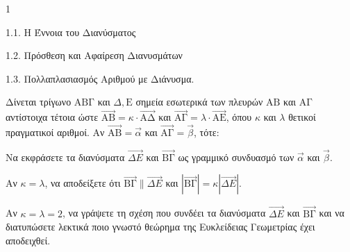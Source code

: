 \begin{ylh}{1}
    \item 1.1. Η Έννοια του Διανύσματος
    \item 1.2. Πρόσθεση και Αφαίρεση Διανυσμάτων
    \item 1.3. Πολλαπλασιασμός Αριθμού με Διάνυσμα.
\end{ylh}
Δίνεται τρίγωνο $\mathrm{AB\Gamma}$ και $\Delta, \mathrm{E}$ σημεία εσωτερικά των πλευρών $\mathrm{AB}$ και $\mathrm{A\Gamma}$ αντίστοιχα τέτοια ώστε $\vec{\mathrm{AB}}=\kappa \cdot \vec{\mathrm{A\Delta}}$ και $\vec{\mathrm{A\Gamma}}=\lambda \cdot \vec{\mathrm{AE}}$, όπου $\kappa$ και $\lambda$ θετικοί πραγματικοί αριθμοί. Αν $\vec{\mathrm{AB}}=\vec{\alpha}$ και $\vec{\mathrm{A\Gamma}}=\vec{\beta}$, τότε:
\begin{alist}
\item Να εκφράσετε τα διανύσματα $\vec{\Delta E}$ και $\vec{\mathrm{B\Gamma}}$ ως γραμμικό συνδυασμό των $\vec{\alpha}$ και $\vec{\beta}$. 
\item
    \begin{rlist}
    \item Αν $\kappa=\lambda$, να αποδείξετε ότι $\vec{\mathrm{B\Gamma}} \parallel \vec{\Delta E}$ και $|\vec{\mathrm{B\Gamma}}| = \kappa |\vec{\Delta E}|$. 
    \item Αν $\kappa=\lambda=2$, να γράψετε τη σχέση που συνδέει τα διανύσματα $\vec{\Delta E}$ και $\vec{\mathrm{B\Gamma}}$ και να διατυπώσετε λεκτικά ποιο γνωστό θεώρημα της Ευκλείδειας Γεωμετρίας έχει αποδειχθεί. 
    \end{rlist}
\end{alist}
